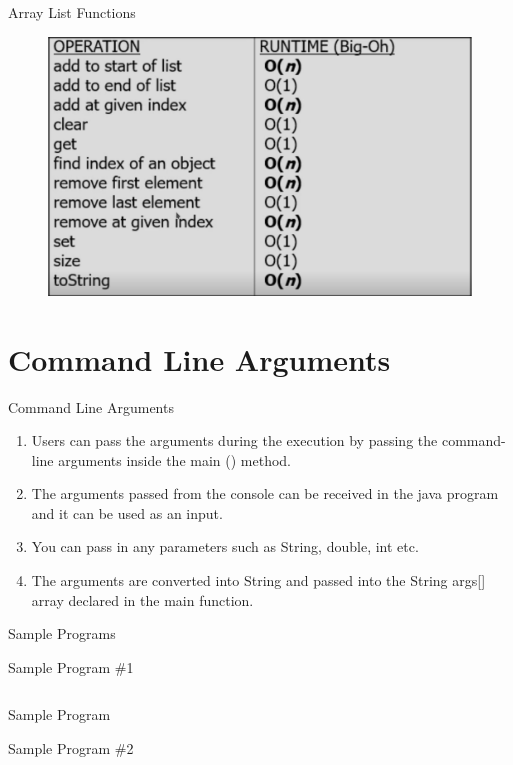 \documentclass[table,xcolor=table]{IFMG-beamer}
\begin{document}
\begin{frame}{Array List Functions}

\begin{figure}
\centering
\includegraphics[width=0.8\linewidth]{figs/arraylist.png}

\end{figure}

\end{frame}

\section{Command Line Arguments}

\begin{frame}{Command Line Arguments}

	\begin{enumerate}[<+->]
    \item Users can pass the arguments during the execution by passing the command-line arguments inside the main () method.
    \item The arguments passed from the console can be received in the java program and it can be used as an input.
    \item You can pass in any parameters such as String, double, int etc.
    \item The arguments are converted into String and passed into the String args[] array declared in the main function.
  \end{enumerate}
  
\end{frame}

\begin{frame}{Sample Programs}
    \begin{block}{Sample Program \#1}
        \inputminted{java}{code/prog1.java}
    \end{block}
\end{frame}

\begin{frame}{Sample Program}
  \begin{block}{Sample Program \#2}
      \inputminted{java}{code/prog2.java}
  \end{block}
\end{frame}
\end{document}
